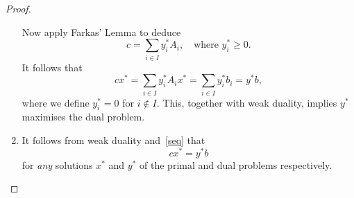 \documentclass[a4paper]{amsart}
\theoremstyle{plain}
\theoremstyle{definition}
\theoremstyle{remark}
\begin{document}
\begin{proof}
\begin{enumerate}
Now apply Farkas' Lemma to deduce    
   \[
   c  = \sum_{i\in I} y_i^*A_i , \quad \text{where } y_i^* \geq 0 .
   \]
It follows that
\begin{equation} \label{seq} 
cx^*  = \sum_{i\in I}  y_i^* A_i x^* = \sum_{i\in I} y_i^* b_i = y^*b ,
\end{equation} 
where we define $ y_i^* = 0 $ for $ i\notin I $.
This, together with weak duality, implies $ y^* $ maximises the dual problem.
\bigskip 

\item It follows from weak duality and~\eqref{seq} that 
\[
cx^* = y^* b 
\]
for \emph{any} solutions $ x^* $ and $ y^* $ of the primal and dual problems respectively.
\end{enumerate}
\end{proof}
 
 



\begin{thebibliography}{9} 

	

\end{thebibliography}
\end{document}
